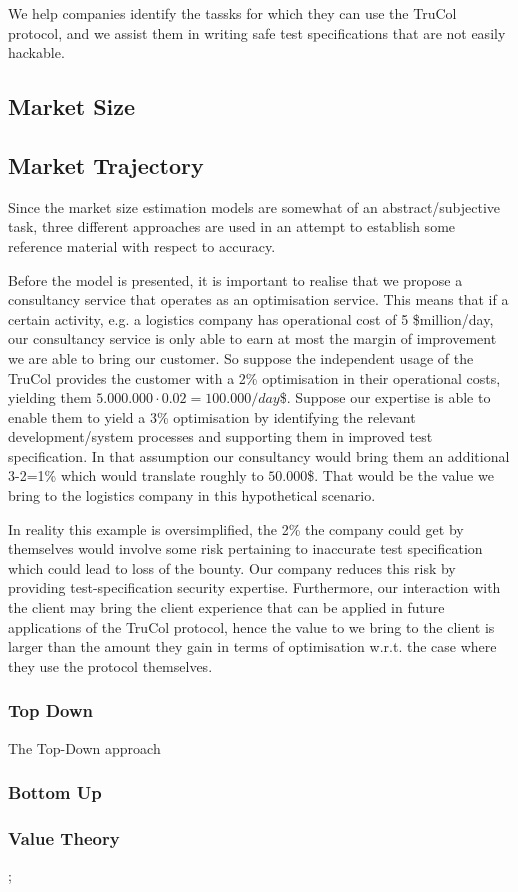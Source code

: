 We help companies identify the tassks for which they can use the TruCol protocol, and we assist them in writing safe test specifications that are not easily hackable. 

\subsection{Market Size}\label{subsec:model_description_market_size}
\subsection{Market Trajectory}\label{subsec:model_description_market_trajectory}

Since the market size estimation models are somewhat of an abstract/subjective task, three different approaches are used in an attempt to establish some reference material with respect to accuracy.



Before the model is presented, it is important to realise that we propose a consultancy service that operates as an optimisation service. This means that if a certain activity, e.g. a logistics company has operational cost of 5 \$million/day, our consultancy service is only able to earn at most the margin of improvement we are able to bring our customer. So suppose the independent usage of the TruCol provides the customer with a 2\% optimisation in their operational costs, yielding them $5.000.000\cdot 0.02=100.000/day$\$. Suppose our expertise is able to enable them to yield a 3\% optimisation by identifying the relevant development/system processes and supporting them in improved test specification. In that assumption our consultancy would bring them an additional 3-2=1\% which would translate roughly to $50.000$\$. That would be the value we bring to the logistics company in this hypothetical scenario.

In reality this example is oversimplified, the 2\% the company could get by themselves would involve some risk pertaining to inaccurate test specification which could lead to loss of the bounty. Our company reduces this risk by providing test-specification security expertise. Furthermore, our interaction with the client may bring the client experience that can be applied in future applications of the TruCol protocol, hence the value to we bring to the client is larger than the amount they gain in terms of optimisation w.r.t. the case where they use the protocol themselves.



\subsubsection{Top Down}\label{subsubsec:model_descriptions_top_down}
The Top-Down approach 
\subsubsection{Bottom Up}\label{subsubsec:model_descriptions_bottom_up}
\subsubsection{Value Theory}\label{subsubsec:model_descriptions_value_theory};